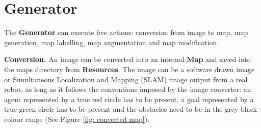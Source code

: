 \section{Generator} \label{sec: generator}

The \textbf{Generator} can execute five actions: conversion from image to map, map generation, map labelling, map augmentation and map modification.

\textbf{Conversion.} An image can be converted into an internal \textbf{Map} and saved into the maps directory from \textbf{Resources}. The image can be a software drawn image or Simultaneous Localization and Mapping (SLAM) image \cite{dissanayake2001solution} output from a real robot, as long as it follows the conventions imposed by the image converter: an agent represented by a true red circle has to be present, a goal represented by a true green circle has to be present and the obstacles need to be in the grey-black colour range (See Figure \ref{fig: converted map}).


